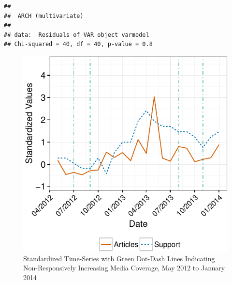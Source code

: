 \documentclass[11pt, oneside]{article}   	%
\begin{document}
\begin{verbatim}
## 
##  ARCH (multivariate)
## 
## data:  Residuals of VAR object varmodel
## Chi-squared = 40, df = 40, p-value = 0.8
\end{verbatim}

\newpage

\begin{figure}[htbp]
\centering
\includegraphics{ukip_media_files/figure-latex/qual-zoomed-plot-1.pdf}
\caption{Standardized Time-Series with Green Dot-Dash Lines Indicating
Non-Responsively Increasing Media Coverage, May 2012 to January 2014}
\end{figure}
\end{document}
